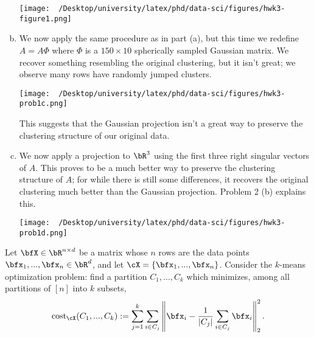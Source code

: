 \begin{homework}[e]
\begin{soln}
\begin{enumerate}[(a)]
        \begin{center}
          \texttt{[image: ~/Desktop/university/latex/phd/data-sci/figures/hwk3-figure1.png]}
          \label{fig:prob1b}
        \end{center}

      \item We now apply the same procedure as in part (a), but this time we redefine $A = A\Phi$ where $\Phi$ is a $150 \times 10$ spherically sampled Gaussian matrix. We recover something resembling the original clustering, but it isn't great; we observe many rows have randomly jumped clusters.
        \begin{center}
          \texttt{[image: ~/Desktop/university/latex/phd/data-sci/figures/hwk3-prob1c.png]}
          \label{fig:prob1c}
        \end{center}
        This suggests that the Gaussian projection isn't a great way to preserve the clustering structure of our original data.
      \item We now apply a projection to $\bR^3$ using the first three right singular vectors of $A$. This proves to be a much better way to preserve the clustering structure of $A$; for while there is still some differences, it recovers the original clustering much better than the Gaussian projection. Problem 2 (b) explains this.
        \begin{center}
          \texttt{[image: ~/Desktop/university/latex/phd/data-sci/figures/hwk3-prob1d.png]}
          \label{fig:prob1d}
        \end{center}
    \end{enumerate}
  \end{soln}
   Let $\bfX\in \bR^{n\times d}$ be a matrix whose $n$ rows are the data points $\bfx_1,...,\bfx_n \in \bR^d$, and let $\cX = \{\bfx_1,...,\bfx_n\}$. Consider the $k$-means optimization problem: find a partition $C_1,...,C_k$ which minimizes, among all partitions of $[n]$ into $k$ subsets,
  \begin{align*}
    \operatorname{cost}_{\cX}(C_1,...,C_k):= \sum_{j=1}^k\sum_{i \in C_j} \left\|\bfx_i - \frac{1}{|C_j|}\sum_{i\in C_j} \bfx_i\right\|^2_2.

\end{align*}
\end{homework}
